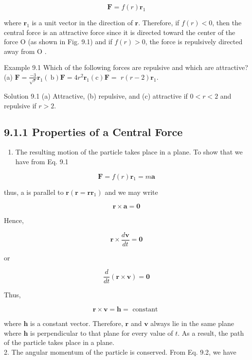 \documentclass[10pt]{article}
\begin{document}
\begin{equation*}
\mathbf{F}=f(r) \mathbf{r}_{1} \tag{9.1}
\end{equation*}


where $\mathbf{r}_{1}$ is a unit vector in the direction of $\mathbf{r}$. Therefore, if $f(r)<0$, then the central force is an attractive force since it is directed toward the center of the force O (as shown in Fig. 9.1) and if $f(r)>0$, the force is repulsively directed away from O .

Example 9.1 Which of the following forces are repulsive and which are attractive? (a) $\mathbf{F}=\frac{-3}{\sqrt{r}} \mathbf{r}_{1}(\mathrm{~b}) \mathbf{F}=4 r^{2} \mathbf{r}_{1}(\mathrm{c}) \mathbf{F}=$ $r(r-2) \mathbf{r}_{1}$.

Solution 9.1 (a) Attractive, (b) repulsive, and (c) attractive if $0<r<2$ and repulsive if $r>2$.

\subsection*{9.1.1 Properties of a Central Force}
\begin{enumerate}
  \item The resulting motion of the particle takes place in a plane. To show that we have from Eq. 9.1
\end{enumerate}

$$
\mathbf{F}=f(r) \mathbf{r}_{1}=m \mathbf{a}
$$

thus, a is parallel to $\mathbf{r}\left(\mathbf{r}=\mathbf{r r}_{1}\right)$ and we may write

$$
\mathbf{r} \times \mathbf{a}=\mathbf{0}
$$

Hence,

$$
\mathbf{r} \times \frac{d \mathbf{v}}{d t}=\mathbf{0}
$$

or

$$
\frac{d}{d t}(\mathbf{r} \times \mathbf{v})=\mathbf{0}
$$

Thus,


\begin{equation*}
\mathbf{r} \times \mathbf{v}=\mathbf{h}=\text { constant } \tag{9.2}
\end{equation*}


where $\mathbf{h}$ is a constant vector. Therefore, $\mathbf{r}$ and $\mathbf{v}$ always lie in the same plane where $\mathbf{h}$ is perpendicular to that plane for every value of $t$. As a result, the path of the particle takes place in a plane.\\
2. The angular momentum of the particle is conserved. From Eq. 9.2, we have
\end{document}
